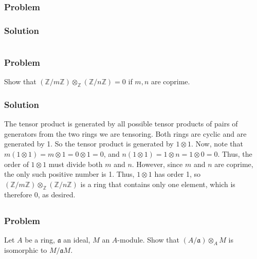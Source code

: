 \documentclass[book,12pt,oneside,openany]{memoir}
\begin{document}
\subsection{Problem}

\subsection{Solution}



\chapter{}

\section{}
\subsection{Problem}
Show that $\left( \mathbb{Z}/m\mathbb{Z} \right) \otimes_{\mathbb{Z}}  \left( \mathbb{Z}/n\mathbb{Z} \right) = 0$ if $m,n$ are coprime.
\subsection{Solution}
The tensor product is generated by all possible tensor products of pairs of generators from the two rings we are tensoring. Both rings are cyclic and are generated by 1. So the tensor product is generated by $1 \otimes 1$.  Now, note that $m (1 \otimes 1) = m \otimes 1 = 0 \otimes 1 = 0$, and $n (1 \otimes 1) = 1 \otimes n = 1 \otimes 0 = 0$. Thus, the order of $1 \otimes 1$ must divide both $m$ and $n$. However, since $m$ and $n$ are coprime, the only such positive number is 1. Thus, $1 \otimes 1$ has order 1, so $\left( \mathbb{Z}/m\mathbb{Z} \right) \otimes_{\mathbb{Z}}  \left( \mathbb{Z}/n\mathbb{Z} \right)$ is a ring that contains only one element, which is therefore 0, as desired.

\section{}
\subsection{Problem}
Let $A$ be a ring, $\mathfrak{a}$ an ideal, $M$ an $A$-module. Show that $(A/\mathfrak{a}) \otimes_{A} M$ is isomorphic to $M/\mathfrak{a}M$.
\end{document}
